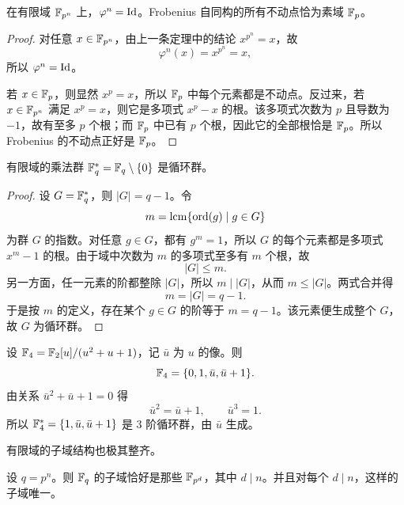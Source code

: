 \begin{corollary}
在有限域 $\mathbb{F}_{p^n}$ 上，$\varphi^n=\mathrm{Id}$。Frobenius 自同构的所有不动点恰为素域 $\mathbb{F}_p$。
\end{corollary}

\begin{proof}
对任意 $x\in\mathbb{F}_{p^n}$，由上一条定理中的结论 $x^{p^n}=x$，故
\[
\varphi^n(x)=x^{p^n}=x,
\]
所以 $\varphi^n=\mathrm{Id}$。

若 $x\in\mathbb{F}_p$，则显然 $x^p=x$，所以 $\mathbb{F}_p$ 中每个元素都是不动点。反过来，若 $x\in\mathbb{F}_{p^n}$ 满足 $x^p=x$，则它是多项式 $x^p-x$ 的根。该多项式次数为 $p$ 且导数为 $-1$，故有至多 $p$ 个根；而 $\mathbb{F}_p$ 中已有 $p$ 个根，因此它的全部根恰是 $\mathbb{F}_p$。所以 Frobenius 的不动点正好是 $\mathbb{F}_p$。
\end{proof}

\begin{theorem}
有限域的乘法群 $\mathbb{F}_q^*=\mathbb{F}_q\setminus\{0\}$ 是循环群。
\end{theorem}

\begin{proof}
设 $G=\mathbb{F}_q^*$，则 $|G|=q-1$。令
\[
m=\operatorname{lcm}\{\mathrm{ord}(g)\mid g\in G\}
\]
为群 $G$ 的指数。对任意 $g\in G$，都有 $g^m=1$，所以 $G$ 的每个元素都是多项式 $x^m-1$ 的根。由于域中次数为 $m$ 的多项式至多有 $m$ 个根，故
\[
|G|\le m.
\]
另一方面，任一元素的阶都整除 $|G|$，所以 $m\mid |G|$，从而 $m\le |G|$。两式合并得
\[
m=|G|=q-1.
\]
于是按 $m$ 的定义，存在某个 $g\in G$ 的阶等于 $m=q-1$。该元素便生成整个 $G$，故 $G$ 为循环群。
\end{proof}

\begin{example}
设 $\mathbb{F}_4=\mathbb{F}_2[u]/(u^2+u+1)$，记 $\bar u$ 为 $u$ 的像。则
\[
\mathbb{F}_4=\{0,1,\bar u,\bar u+1\}.
\]
由关系 $\bar u^2+\bar u+1=0$ 得
\[
\bar u^2=\bar u+1,
\qquad \bar u^3=1.
\]
所以 $\mathbb{F}_4^*=\{1,\bar u,\bar u+1\}$ 是 3 阶循环群，由 $\bar u$ 生成。
\end{example}

有限域的子域结构也极其整齐。

\begin{theorem}[有限域的子域分类]
设 $q=p^n$。则 $\mathbb{F}_q$ 的子域恰好是那些 $\mathbb{F}_{p^d}$，其中 $d\mid n$。并且对每个 $d\mid n$，这样的子域唯一。
\end{theorem}

